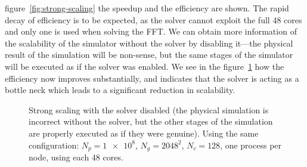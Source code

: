 figure~\ref{fig:strong-scaling} the speedup and the efficiency are shown.
The rapid decay of efficiency is to be expected, as the solver cannot exploit 
the full 48 cores and only one is used when solving the FFT. We can obtain more 
information of the scalability of the simulator without the solver by disabling 
it---the physical result of the simulation will be non-sense, but the same 
stages of the simulator will be executed as if the solver was enabled. We see in 
the figure~\ref{fig:strong-scaling-without-solver} how the efficiency now 
improves substantially, and indicates that the solver is acting as a bottle neck 
which leads to a significant reduction in scalability.
%
\begin{figure}[ht]%
\centering
{}
	\caption{Strong scaling with the solver disabled (the physical simulation is 
	incorrect without the solver, but the other stages of the simulation are 
	properly executed as if they were genuine).  Using the same configuration: 
	$N_p = \num{1e8}$, $N_g = 2048^2$,
	$N_c = 128$, one process per node, using each 48 cores.}
	\label{fig:strong-scaling-without-solver}
\end{figure}%
%


